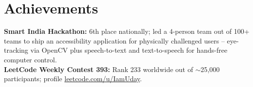 \section{Achievements}
\small \textbf{Smart India Hackathon:} 6th place nationally; led a 4-person team out of 100+ teams to ship an accessibility application for physically challenged users -- eye-tracking via OpenCV plus speech-to-text and text-to-speech for hands-free computer control. \\
\textbf{LeetCode Weekly Contest 393:} Rank 233 worldwide out of $\sim$25{,}000 participants; profile \href{https://leetcode.com/u/IamUday/}{leetcode.com/u/IamUday}.
